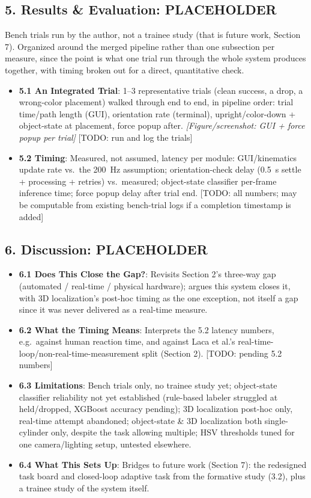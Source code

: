 \documentclass[11pt]{article}
\begin{document}
\subsection*{5. Results \& Evaluation: PLACEHOLDER}
Bench trials run by the author, not a trainee study (that is future
work, Section 7). Organized around the merged pipeline rather than
one subsection per measure, since the point is what one trial run
through the whole system produces together, with timing broken out
for a direct, quantitative check.
\begin{itemize}
  \item \textbf{5.1 An Integrated Trial}: 1--3 representative trials
  (clean success, a drop, a wrong-color placement) walked through end
  to end, in pipeline order: trial time/path length (GUI), orientation
  rate (terminal), upright/color-down + object-state at placement,
  force popup after. \emph{[Figure/screenshot: GUI + force popup per
  trial]} [TODO: run and log the trials]
  \item \textbf{5.2 Timing}: Measured, not assumed, latency per
  module: GUI/kinematics update rate vs.\ the 200~Hz assumption;
  orientation-check delay (0.5~s settle + processing + retries) vs.\
  measured; object-state classifier per-frame inference time; force
  popup delay after trial end. [TODO: all numbers; may be computable
  from existing bench-trial logs if a completion timestamp is added]
\end{itemize}


\subsection*{6. Discussion: PLACEHOLDER}
\begin{itemize}
  \item \textbf{6.1 Does This Close the Gap?}: Revisits Section 2's
  three-way gap (automated / real-time / physical hardware); argues
  this system closes it, with 3D localization's post-hoc timing as
  the one exception, not itself a gap since it was never delivered as
  a real-time measure.
  \item \textbf{6.2 What the Timing Means}: Interprets the 5.2 latency
  numbers, e.g.\ against human reaction time, and against Laca et
  al.'s real-time-loop/non-real-time-measurement split (Section 2).
  [TODO: pending 5.2 numbers]
  \item \textbf{6.3 Limitations}: Bench trials only, no trainee study
  yet; object-state classifier reliability not yet established
  (rule-based labeler struggled at held/dropped, XGBoost accuracy
  pending); 3D localization post-hoc only, real-time attempt
  abandoned; object-state \& 3D localization both single-cylinder
  only, despite the task allowing multiple; HSV thresholds tuned for
  one camera/lighting setup, untested elsewhere.
  \item \textbf{6.4 What This Sets Up}: Bridges to future work
  (Section 7): the redesigned task board and closed-loop adaptive
  task from the formative study (3.2), plus a trainee study of the
  system itself.
\end{itemize}
\end{document}
